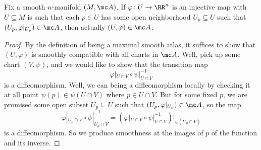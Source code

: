 \documentclass[../notes.tex]{subfiles}
\begin{document}
\begin{lemma}
	Fix a smooth $n$-manifold $(M,\mc A)$. If $\varphi\colon U\to\RR^n$ is an injective map with $U\subseteq M$ is such that each $p\in U$ has some open neighborhood $U_p\subseteq U$ such that $(U_p,\varphi|_{U_p})\in\mc A$, then actually $(U,\varphi)\in\mc A$.
\end{lemma}
\begin{proof}
	By the definition of being a maximal smooth atlas, it suffices to show that $(U,\varphi)$ is smoothly compatible with all charts in $\mc A$. Well, pick up some chart $(V,\psi)$, and we would like to show that the transition map
	\[\varphi|_{U\cap V}\circ\psi|_{U\cap V}^{-1}\]
	is a diffeomorphism. Well, we can being a diffeomorphism locally by checking it at all point $\psi(p)\in\psi(U\cap V)$ where $p\in U\cap V$. But for some fixed $p$, we are promised some open subset $U_p\subseteq U$ such that $(U_p,\varphi|_{U_p})\in\mc A$, so the map
	\[\varphi|_{U_p\cap V}\circ\psi|_{U_p\cap V}^{-1}=\left(\varphi|_{U\cap V}\circ\psi|_{U\cap V}^{-1}\right)|_{\psi(U_p\cap V)}\]
	is a diffeomorphism. So we produce smoothness at the images of $p$ of the function and its inverse.
\end{proof}
\end{document}
